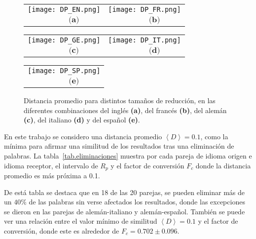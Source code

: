\begin{figure}[t]
	\centering
	\begin{tabular}{cc}
		\texttt{[image: DP\_EN.png]} &
		\texttt{[image: DP\_FR.png]} \\
		$\,\,\,\,\,\,\,\,\,\,\,\,\,\,\, \textbf{(a)}$    & 
		$\,\,\,\,\,\,\,\,\,\,\,\,\,\,\, \textbf{(b)}$ \\
	\end{tabular}
	
	\begin{tabular}{cc}
		\texttt{[image: DP\_GE.png]} &
		\texttt{[image: DP\_IT.png]} \\
		$\,\,\,\,\,\,\,\,\,\,\,\,\,\,\, \textbf{(c)}$    & 
		$\,\,\,\,\,\,\,\,\,\,\,\,\,\,\, \textbf{(d)}$    \\
	\end{tabular}
	\begin{tabular}{c}
		\texttt{[image: DP\_SP.png]} \\
		$\,\,\,\,\,\,\,\,\,\,\,\,\,\,\, \textbf{(e)}$  \\
	\end{tabular}
	\caption{Distancia promedio para distintos tamaños de reducción, en las diferentes combinaciones del inglés \textbf{(a)}, del francés \textbf{(b)}, del alemán \textbf{(c)}, del italiano \textbf{(d)} y del español \textbf{(e)}.}
	\label{fig.DP_eliminacion}
\end{figure} 


En este trabajo se considero una distancia promedio $\left\langle D \right\rangle=0.1 $, como la mínima para afirmar una similitud de los resultados tras una eliminación de palabras. La tabla~\ref{tab.eliminaciones} muestra  por cada pareja de idioma origen e idioma receptor, el intervalo de $R_{p}$  y el factor de conversión $F_{c}$ donde la distancia promedio es más próxima a 0.1.

De está tabla se destaca que en 18 de las 20 parejas, se pueden eliminar más de un $40\%$ de las palabras sin verse afectados los resultados, donde las excepciones se dieron en las parejas de alemán-italiano y alemán-español.  También se puede ver una relación entre el valor mínimo de similitud  $\left\langle D \right\rangle=0.1 $ y el factor de conversión, donde este es alrededor de $F_{c}= 0.702 \pm 0.096$.




